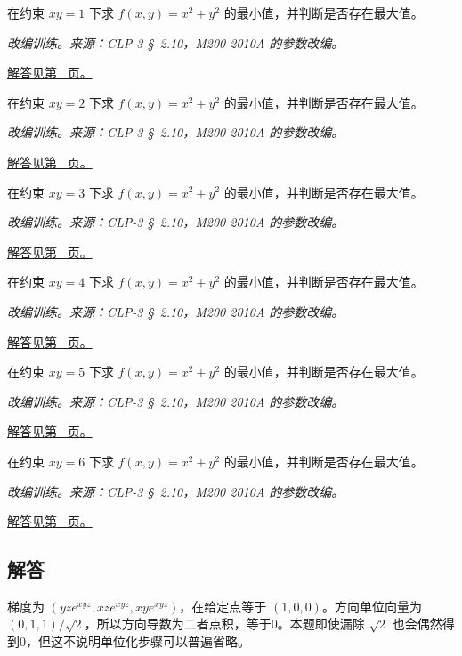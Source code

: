 \documentclass[12pt,fontset=fandol]{ctexart}
\begin{document}
\begin{example}[双曲线上的约束最值]\label{ex:c34q20}
在约束 $xy=1$ 下求 $f(x,y)=x^2+y^2$ 的最小值，并判断是否存在最大值。
\par\textit{改编训练。来源：CLP-3 \S~2.10，M200 2010A 的参数改编。}\par\hyperref[ans:c34q20]{解答见第~\pageref{ans:c34q20} 页。}
\end{example}
\begin{example}[双曲线上的约束最值]\label{ex:c34q21}
在约束 $xy=2$ 下求 $f(x,y)=x^2+y^2$ 的最小值，并判断是否存在最大值。
\par\textit{改编训练。来源：CLP-3 \S~2.10，M200 2010A 的参数改编。}\par\hyperref[ans:c34q21]{解答见第~\pageref{ans:c34q21} 页。}
\end{example}
\begin{example}[双曲线上的约束最值]\label{ex:c34q22}
在约束 $xy=3$ 下求 $f(x,y)=x^2+y^2$ 的最小值，并判断是否存在最大值。
\par\textit{改编训练。来源：CLP-3 \S~2.10，M200 2010A 的参数改编。}\par\hyperref[ans:c34q22]{解答见第~\pageref{ans:c34q22} 页。}
\end{example}
\begin{example}[双曲线上的约束最值]\label{ex:c34q23}
在约束 $xy=4$ 下求 $f(x,y)=x^2+y^2$ 的最小值，并判断是否存在最大值。
\par\textit{改编训练。来源：CLP-3 \S~2.10，M200 2010A 的参数改编。}\par\hyperref[ans:c34q23]{解答见第~\pageref{ans:c34q23} 页。}
\end{example}
\begin{example}[双曲线上的约束最值]\label{ex:c34q24}
在约束 $xy=5$ 下求 $f(x,y)=x^2+y^2$ 的最小值，并判断是否存在最大值。
\par\textit{改编训练。来源：CLP-3 \S~2.10，M200 2010A 的参数改编。}\par\hyperref[ans:c34q24]{解答见第~\pageref{ans:c34q24} 页。}
\end{example}
\begin{example}[双曲线上的约束最值]\label{ex:c34q25}
在约束 $xy=6$ 下求 $f(x,y)=x^2+y^2$ 的最小值，并判断是否存在最大值。
\par\textit{改编训练。来源：CLP-3 \S~2.10，M200 2010A 的参数改编。}\par\hyperref[ans:c34q25]{解答见第~\pageref{ans:c34q25} 页。}
\end{example}
\subsection{解答}
\begin{solve}\label{ans:c34q1}
梯度为 $(yze^{xyz},xze^{xyz},xye^{xyz})$，在给定点等于 $(1,0,0)$。方向单位向量为 $(0,1,1)/\sqrt2$，所以方向导数为二者点积，等于0。本题即使漏除 $\sqrt2$ 也会偶然得到0，但这不说明单位化步骤可以普遍省略。
\end{solve}
\end{document}
